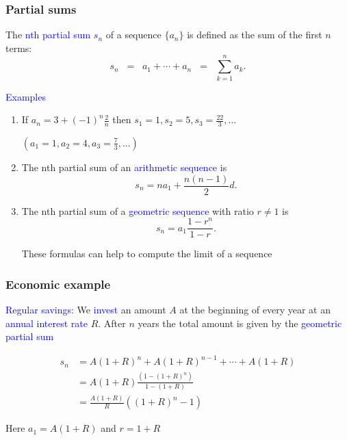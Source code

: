 \documentclass[11pt,aspectratio=169]{beamer}
\begin{document}
\begin{frame}
\frametitle{Partial sums}
The \textcolor{blue}{nth partial sum $s_n$} of a sequence $\{a_n\}$ is defined as the sum of the first $n$ terms:
$$
s_n\;\;=\;\;a_1+\cdots+a_n\;\;=\;\;\sum_{k=1}^n a_k.
$$

\textcolor{blue}{Examples} 
\begin{enumerate}
\item If $a_n=3+(-1)^n \frac{2}{n}$ then
$
s_1=1, s_2=5, s_3=\frac{22}{3},\dots
$

\begin{tiny}$(a_1=1, a_2=4,a_3=\frac73,...)$ \end{tiny}

\item The nth partial sum of an \textcolor{blue}{arithmetic sequence} is $$s_n=n a_1+\frac{n(n-1)}{2}d.$$



\item The nth partial sum of a \textcolor{blue}{geometric sequence} with ratio $r \neq 1$ is $$s_n=a_1 \frac{1-r^n}{1-r}.$$
\begin{tiny}These formulas can help to compute the limit of a sequence\end{tiny}
\end{enumerate}


\end{frame}

\begin{frame}
\frametitle{Economic example }
\textcolor{blue}{Regular savings:} We \textcolor{blue}{invest} an amount $A$ at the beginning of every year at an \textcolor{blue}{annual interest rate} $R$. After $n$ years the total amount is given by the \textcolor{blue}{geometric partial sum} 

\begin{align*}
s_n&=A(1+R)^n+A(1+R)^{n-1}+\cdots+A(1+R)\\
&= A(1+R)\frac{(1-(1+R)^n)}{1-(1+R)}\\
&=\frac{A(1+R)}{R}((1+R)^n-1)
\end{align*}
\begin{tiny} Here $a_1=A(1+R)$ and $r=1+R$\end{tiny}
\end{frame}
\end{document}

